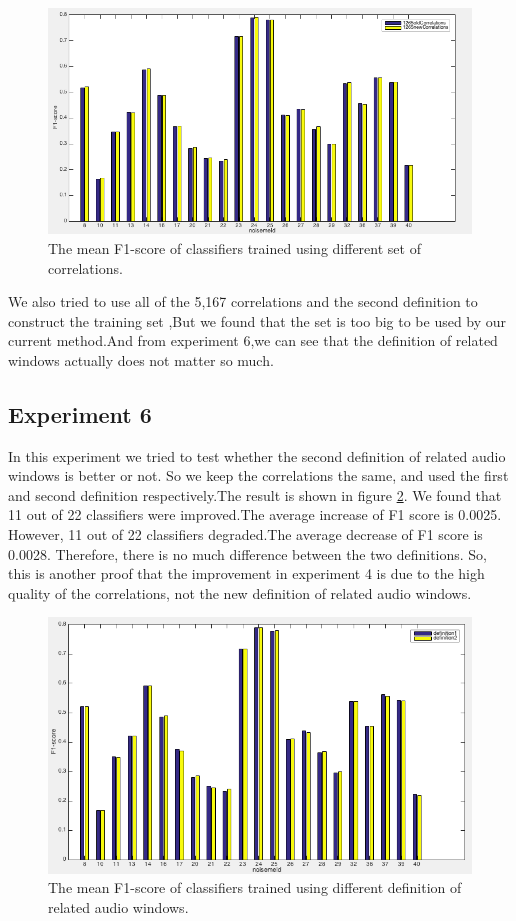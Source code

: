 \documentclass[conference, 11pt, onecolumn]{IEEEtran}
\begin{document}
\begin{figure}[h!]
\centering
\includegraphics[scale=0.45]{figure/twoKindsCorre.png}
\caption{The mean F1-score of classifiers trained using different set of correlations.}
\label{fig:twoKindsCorre}
\end{figure}

We also tried to use all of the 5,167 correlations and the second definition to construct the training set ,But we found that the set is too big to be used by our current method.And from experiment 6,we can see that the definition of related windows actually does not matter so much.

\subsection{Experiment 6}
In this experiment we tried to test whether the second definition of related audio windows is better or not.
So we keep the correlations the same, and used the first and second definition respectively.The result is shown in figure \ref{fig:twoKindsDef}. We  found  that  11  out  of  22  classifiers  were  improved.The average increase of F1 score is 0.0025. However, 11 out of 22 classifiers degraded.The average decrease of F1 score is 0.0028.
Therefore, there is no much difference between the two definitions. So, this is another proof that the improvement in experiment 4 is due to the high quality of the correlations, not the new definition of related audio windows.

\begin{figure}[h!]
\centering
\includegraphics[scale=0.45]{figure/twoKindsDef.png}
\caption{The mean F1-score of classifiers trained using different definition of related audio windows.}
\label{fig:twoKindsDef}
\end{figure}
\end{document}
